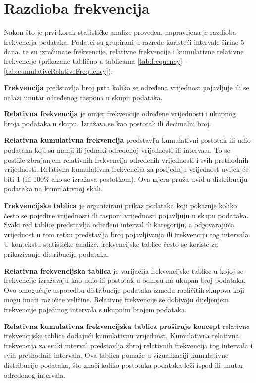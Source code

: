 \section{Razdioba frekvencija}

Nakon što je prvi korak statističke analize proveden, napravljena je razdioba frekvencija podataka. Podatci su grupirani u razrede koristeći intervale širine 5 dana, te su izračunate frekvencije, relativne frekvencije i kumulativne relativne frekvencije (prikazane tablično u tablicama \ref{tab:frequency} - \ref{tab:cumulativeRelativeFrequency}).

\textbf{Frekvencija} predstavlja broj puta koliko se određena vrijednost pojavljuje ili se nalazi unutar određenog raspona u skupu podataka.

\textbf{Relativna frekvencija} je omjer frekvencije određene vrijednosti i ukupnog broja podataka u skupu. Izražava se kao postotak ili decimalni broj.

\textbf{Relativna kumulativna frekvencija} predstavlja kumulativni postotak ili udio podataka koji su manji ili jednaki određenoj vrijednosti ili intervalu. To se postiže zbrajanjem relativnih frekvencija određenih vrijednosti i svih prethodnih vrijednosti. Relativna kumulativna frekvencija za posljednju vrijednost uvijek će biti 1 (ili 100\% ako se izražava postotkom). Ova mjera pruža uvid u distribuciju podataka na kumulativnoj skali.

\textbf{Frekvencijska tablica} je organizirani prikaz podataka koji pokazuje koliko često se pojedine vrijednosti ili rasponi vrijednosti pojavljuju u skupu podataka. Svaki red tablice predstavlja određeni interval ili kategoriju, a odgovarajuća vrijednost u tom retku predstavlja broj pojavljivanja ili frekvenciju tog intervala. U kontekstu statističke analize, frekvencijske tablice često se koriste za prikazivanje distribucije podataka.

\textbf{Relativna frekvencijska tablica} je varijacija frekvencijske tablice u kojoj se frekvencije izražavaju kao udio ili postotak u odnosu na ukupan broj podataka. Ovo omogućuje usporedbu distribucije podataka između različitih skupova koji mogu imati različite veličine. Relativne frekvencije se dobivaju dijeljenjem frekvencije pojedinog intervala s ukupnim brojem podataka.

\textbf{Relativna kumulativna frekvencijska tablica proširuje koncept} relativne frekvencijske tablice dodajući kumulativnu vrijednost. Kumulativna relativna frekvencija za svaki interval predstavlja zbroj relativnih frekvencija tog intervala i svih prethodnih intervala. Ova tablica pomaže u vizualizaciji kumulativne distribucije podataka, što znači koliko postotaka podataka leži ispod ili unutar određenog intervala.

